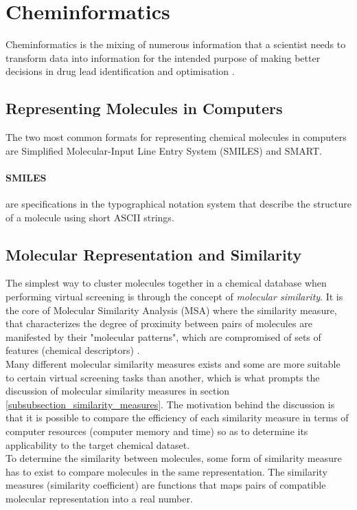 \documentclass[a4paper,12pt]{report}
\begin{document}
	\section{Cheminformatics}
	Cheminformatics is the mixing of numerous information that a scientist needs to transform data into information for the intended purpose of making better decisions in drug lead identification and optimisation \cite{FKBrown1998}.
		\subsection{Representing Molecules in Computers}
		The two most common formats for representing chemical molecules in computers are Simplified Molecular-Input Line Entry System (SMILES) and SMART.
			\paragraph{SMILES} are specifications in the typographical notation system that describe the structure of a molecule using short ASCII strings. 
		\subsection{Molecular Representation and Similarity }
		The simplest way to cluster molecules together in a chemical database when performing virtual screening is through the concept of \textit{molecular similarity}. It is the core of Molecular Similarity Analysis (MSA) where the similarity measure, that characterizes the degree of proximity between pairs of molecules are manifested by their "molecular patterns", which are compromised of sets of features (chemical descriptors) \cite{Jurgen2004}. \\
		Many different molecular similarity measures exists and some are more suitable to certain virtual screening tasks than another, which is what prompts the discussion of molecular similarity measures in section \ref{subsubsection_similarity_measures}. The motivation behind the discussion is that it is possible to compare the efficiency of each similarity measure in terms of computer resources (computer memory and time) so as to determine its applicability to the target chemical dataset.\\
		To determine the similarity between molecules, some form of similarity measure has to exist to compare molecules in the same representation. The similarity measures (similarity coefficient) are functions that maps pairs of compatible molecular representation into a real number. 
\end{document}
